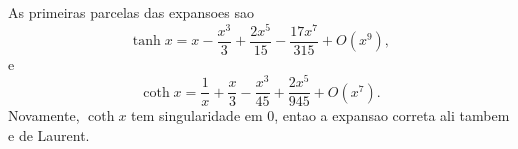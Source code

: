 As primeiras parcelas das expansoes sao
\[
\tanh x = x - \frac{x^3}{3} + \frac{2x^5}{15} - \frac{17x^7}{315} + O(x^9),
\]
e
\[
\coth x = \frac{1}{x} + \frac{x}{3} - \frac{x^3}{45} + \frac{2x^5}{945} + O(x^7).
\]
Novamente, $\coth x$ tem singularidade em $0$, entao a expansao correta ali tambem e de Laurent.

